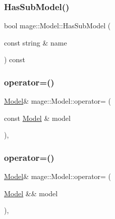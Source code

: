 \subsubsection{\texorpdfstring{Has\+Sub\+Model()}{HasSubModel()}}
{\footnotesize\ttfamily bool mage\+::\+Model\+::\+Has\+Sub\+Model (\begin{DoxyParamCaption}\item[{const string \&}]{name }\end{DoxyParamCaption}) const}

\hypertarget{classmage_1_1_model_a563515c64ec39cfcda9f6ca37576391b}{}\label{classmage_1_1_model_a563515c64ec39cfcda9f6ca37576391b} 
\subsubsection{\texorpdfstring{operator=()}{operator=()}\hspace{0.1cm}{\footnotesize\ttfamily [1/2]}}
{\footnotesize\ttfamily \hyperlink{classmage_1_1_model}{Model}\& mage\+::\+Model\+::operator= (\begin{DoxyParamCaption}\item[{const \hyperlink{classmage_1_1_model}{Model} \&}]{model }\end{DoxyParamCaption})\hspace{0.3cm}{\ttfamily [private]}, {\ttfamily [delete]}}

\hypertarget{classmage_1_1_model_a084e30d15822bfefa79128f30a57cc02}{}\label{classmage_1_1_model_a084e30d15822bfefa79128f30a57cc02} 
\subsubsection{\texorpdfstring{operator=()}{operator=()}\hspace{0.1cm}{\footnotesize\ttfamily [2/2]}}
{\footnotesize\ttfamily \hyperlink{classmage_1_1_model}{Model}\& mage\+::\+Model\+::operator= (\begin{DoxyParamCaption}\item[{\hyperlink{classmage_1_1_model}{Model} \&\&}]{model }\end{DoxyParamCaption})\hspace{0.3cm}{\ttfamily [private]}, {\ttfamily [delete]}}



